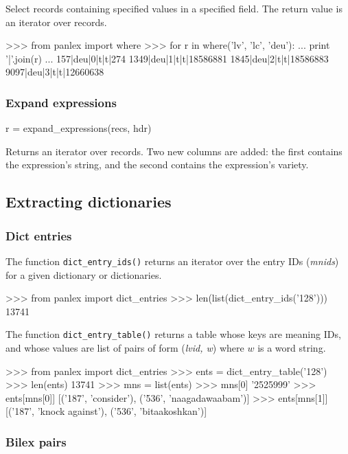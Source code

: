 Select records containing specified values in a specified field.
The return value is an iterator over records.
\begin{myverb}
>>> from panlex import where
>>> for r in where('lv', 'lc', 'deu'):
...     print '|'.join(r)
...
157|deu|0|t|t|274
1349|deu|1|t|t|18586881
1845|deu|2|t|t|18586883
9097|deu|3|t|t|12660638
\end{myverb}

\subsubsection{Expand expressions}

\begin{myverb}
r = expand_expressions(recs, hdr)
\end{myverb}
Returns an iterator over records.  Two new columns are added: the
first contains the expression's string, and the second contains the
expression's variety.


\subsection{Extracting dictionaries}

\subsubsection{Dict entries}

The function \verb|dict_entry_ids()| returns an iterator over the entry IDs
({\it mnids\/}) for a given dictionary or dictionaries.
\begin{myverb}
>>> from panlex import dict_entries
>>> len(list(dict_entry_ids('128')))
13741
\end{myverb}
The function \verb|dict_entry_table()| returns a table whose keys are
meaning IDs, and whose values are list of pairs of form ({\it lvid, w\/})
where $w$ is a word string.
\begin{myverb}
>>> from panlex import dict_entries
>>> ents = dict_entry_table('128')
>>> len(ents)
13741
>>> mns = list(ents)
>>> mns[0]
'2525999'
>>> ents[mns[0]]
[('187', 'consider'), ('536', 'naagadawaabam')]
>>> ents[mns[1]]
[('187', 'knock against'), ('536', 'bitaakoshkan')]
\end{myverb}

\subsubsection{Bilex pairs}

